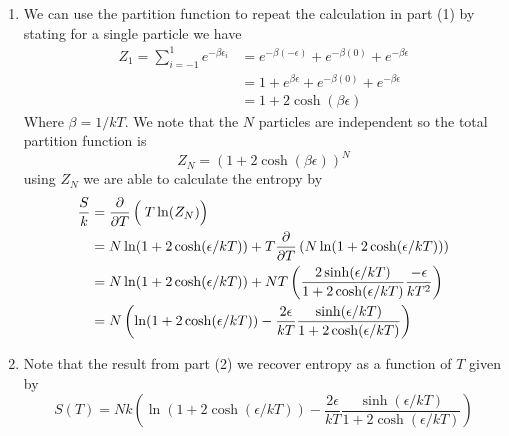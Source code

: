\documentclass[11pt]{article}
\numberwithin{equation}{section}
\begin{document}
\begin{enumerate}[(1)]
\item We can use the partition function to repeat the calculation in part (1) by stating 
for a single particle we have
\begin{align*}
Z_{1} = \sum_{i=-1}^{1}e^{-\beta\epsilon_{i}} &= e^{-\beta(-\epsilon)} + e^{-\beta(0)} + e^{-\beta\epsilon}\\
&= 1 + e^{\beta\epsilon} + e^{-\beta(0)} + e^{-\beta\epsilon}\\
&= 1 + 2\cosh(\beta\epsilon)
\end{align*}
Where $\beta = 1/kT$. We note that the $N$ particles are independent so the total partition 
function is
$$Z_N = (1 + 2\cosh(\beta\epsilon))^N$$
using $Z_N$ we are able to calculate the entropy by
\begin{align*}
\frac{S}{k} &= \frac{\partial{}}{\partial{T}}\left(\frac{}{}T\ln(Z_N)\right)\\
&= N\ln(1+2\cosh(\epsilon/kT)) + T\frac{\partial{}}{\partial{T}}\left(N\ln(1+2\cosh(\epsilon/kT))\right)\\
&= N\ln(1+2\cosh(\epsilon/kT)) + NT\left(\frac{2\sinh(\epsilon/kT)}{1+2\cosh(\epsilon/kT)}\frac{-\epsilon}{kT^2}\right)\\
&= N\left(\ln(1+2\cosh(\epsilon/kT)) - \frac{2\epsilon}{kT}\frac{\sinh(\epsilon/kT)}{1+2\cosh(\epsilon/kT)}\right)
\end{align*}

\item Note that the result from part (2) we recover entropy as a function of $T$ given by
$$S(T) = Nk\left(\ln(1+2\cosh(\epsilon/kT)) - \frac{2\epsilon}{kT}\frac{\sinh(\epsilon/kT)}{1+2\cosh(\epsilon/kT)}\right)$$


\end{enumerate}
\end{document}

